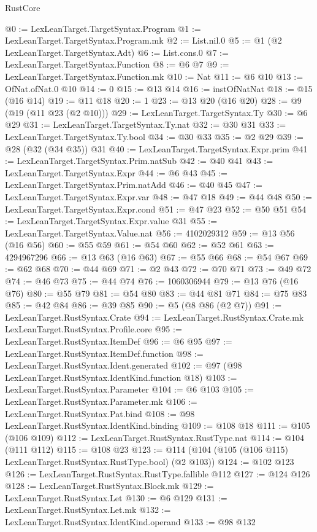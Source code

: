 \begin{lexlean}{RustCore}
\begin{coremodule}
@0 := LexLeanTarget.TargetSyntax.Program
@1 := LexLeanTarget.TargetSyntax.Program.mk
@2 := List.nil.{0}
@5 := @1 (@2 LexLeanTarget.TargetSyntax.Adt)
@6 := List.cons.{0}
@7 := LexLeanTarget.TargetSyntax.Function
@8 := @6 @7
@9 := LexLeanTarget.TargetSyntax.Function.mk
@10 := Nat
@11 := @6 @10
@13 := OfNat.ofNat.{0} @10
@14 := 0
@15 := @13 @14
@16 := instOfNatNat
@18 := @15 (@16 @14)
@19 := @11 @18
@20 := 1
@23 := @13 @20 (@16 @20)
@28 := @9 (@19 (@11 @23 (@2 @10)))
@29 := LexLeanTarget.TargetSyntax.Ty
@30 := @6 @29
@31 := LexLeanTarget.TargetSyntax.Ty.nat
@32 := @30 @31
@33 := LexLeanTarget.TargetSyntax.Ty.bool
@34 := @30 @33
@35 := @2 @29
@39 := @28 (@32 (@34 @35)) @31
@40 := LexLeanTarget.TargetSyntax.Expr.prim
@41 := LexLeanTarget.TargetSyntax.Prim.natSub
@42 := @40 @41
@43 := LexLeanTarget.TargetSyntax.Expr
@44 := @6 @43
@45 := LexLeanTarget.TargetSyntax.Prim.natAdd
@46 := @40 @45
@47 := LexLeanTarget.TargetSyntax.Expr.var
@48 := @47 @18
@49 := @44 @48
@50 := LexLeanTarget.TargetSyntax.Expr.cond
@51 := @47 @23
@52 := @50 @51
@54 := LexLeanTarget.TargetSyntax.Expr.value @31
@55 := LexLeanTarget.TargetSyntax.Value.nat
@56 := 4102029312
@59 := @13 @56 (@16 @56)
@60 := @55 @59
@61 := @54 @60
@62 := @52 @61
@63 := 4294967296
@66 := @13 @63 (@16 @63)
@67 := @55 @66
@68 := @54 @67
@69 := @62 @68
@70 := @44 @69
@71 := @2 @43
@72 := @70 @71
@73 := @49 @72
@74 := @46 @73
@75 := @44 @74
@76 := 1060306944
@79 := @13 @76 (@16 @76)
@80 := @55 @79
@81 := @54 @80
@83 := @44 @81 @71
@84 := @75 @83
@85 := @42 @84
@86 := @39 @85
@90 := @5 (@8 @86 (@2 @7))
@91 := LexLeanTarget.RustSyntax.Crate
@94 := LexLeanTarget.RustSyntax.Crate.mk LexLeanTarget.RustSyntax.Profile.core
@95 := LexLeanTarget.RustSyntax.ItemDef
@96 := @6 @95
@97 := LexLeanTarget.RustSyntax.ItemDef.function
@98 := LexLeanTarget.RustSyntax.Ident.generated
@102 := @97 (@98 LexLeanTarget.RustSyntax.IdentKind.function @18)
@103 := LexLeanTarget.RustSyntax.Parameter
@104 := @6 @103
@105 := LexLeanTarget.RustSyntax.Parameter.mk
@106 := LexLeanTarget.RustSyntax.Pat.bind
@108 := @98 LexLeanTarget.RustSyntax.IdentKind.binding
@109 := @108 @18
@111 := @105 (@106 @109)
@112 := LexLeanTarget.RustSyntax.RustType.nat
@114 := @104 (@111 @112)
@115 := @108 @23
@123 := @114 (@104 (@105 (@106 @115) LexLeanTarget.RustSyntax.RustType.bool) (@2 @103))
@124 := @102 @123
@126 := LexLeanTarget.RustSyntax.RustType.fallible @112
@127 := @124 @126
@128 := LexLeanTarget.RustSyntax.Block.mk
@129 := LexLeanTarget.RustSyntax.Let
@130 := @6 @129
@131 := LexLeanTarget.RustSyntax.Let.mk
@132 := LexLeanTarget.RustSyntax.IdentKind.operand
@133 := @98 @132

\end{coremodule}
\end{lexlean}
